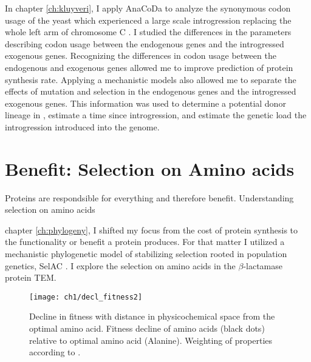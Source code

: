 In chapter \ref{ch:kluyveri}, I apply AnaCoDa to analyze the synonymous codon usage of the yeast \kluyveri which experienced a large scale introgression replacing the whole left arm of chromosome C \citep{friedrich2015}.
I studied the differences in the parameters describing codon usage between the endogenous \kluyveri genes and the introgressed exogenous genes.
Recognizing the differences in codon usage between the endogenous and exogenous genes allowed me to improve prediction of protein synthesis rate.
Applying a mechanistic models also allowed me to separate the effects of mutation and selection in the endogenous \kluyveri genes and the introgressed exogenous genes.
This information was used to determine a potential donor lineage in \gossypii, estimate a time since introgression, and estimate the genetic load the introgression introduced into the \kluyveri genome.

\section{Benefit: Selection on Amino acids}

Proteins are respondsible for everything and therefore benefit. 
Understanding selection on amino acids 

chapter \ref{ch:phylogeny}, I shifted my focus from the cost of protein synthesis to the functionality or benefit a protein produces.
For that matter I utilized a mechanistic phylogenetic model of stabilizing selection rooted in population genetics, SelAC \cite{beaulieu2018}.
I explore the selection on amino acids in the $\beta$-lactamase protein TEM.

\singlespacing
\begin{figure}[H]
     \centering
	\texttt{[image: ch1/decl\_fitness2]}
	\caption{Decline in fitness with distance in physicochemical space from the optimal amino acid. 
	Fitness decline of amino acids (black dots) relative to optimal amino acid (Alanine). Weighting of properties according to \citet{grantham1974}.}
	\label{fig:decl_fit}
\end{figure}
\doublespacing
